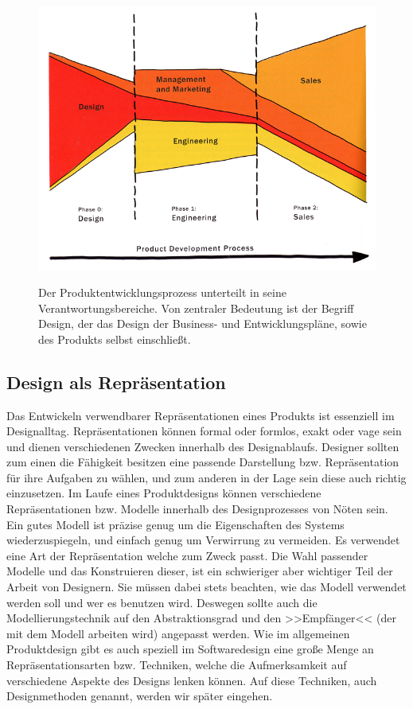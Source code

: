 \begin{figure}
        {\includegraphics[width=\linewidth]{gfx/buxtonProductDevProcess}}
		\caption[Der Produktentwicklungsprozess \newline \citep{Buxton:2007}]{Der Produktentwicklungsprozess unterteilt in seine Verantwortungsbereiche. Von zentraler Bedeutung ist der Begriff Design, der das Design der Business- und Entwicklungspläne, sowie des Produkts selbst einschließt.}\label{fig:buxtonProductDevProcess}
\end{figure}

\subsection{Design als Repräsentation}
Das Entwickeln verwendbarer Repräsentationen eines Produkts ist essenziell im Designalltag. Repräsentationen können formal oder formlos, exakt oder vage sein und dienen verschiedenen Zwecken innerhalb des Designablaufs. Designer sollten zum einen die Fähigkeit besitzen eine passende Darstellung bzw. Repräsentation für ihre Aufgaben zu wählen, und zum anderen in der Lage sein diese auch richtig einzusetzen.
Im Laufe eines Produktdesigns können verschiedene Repräsentationen bzw. Modelle innerhalb des Designprozesses von Nöten sein. Ein gutes Modell ist präzise genug um die Eigenschaften des Systems wiederzuspiegeln, und einfach genug um Verwirrung zu vermeiden. Es verwendet eine Art der Repräsentation welche zum Zweck passt.
Die Wahl passender Modelle und das Konstruieren dieser, ist ein schwieriger aber wichtiger Teil der Arbeit von Designern. Sie müssen dabei stets beachten, wie das Modell verwendet werden soll und wer es benutzen wird. Deswegen sollte auch die Modellierungstechnik auf den Abstraktionsgrad und den >>Empfänger<< (der mit dem Modell arbeiten wird) angepasst werden. \citep{Preece:1994}
Wie im allgemeinen Produktdesign gibt es auch speziell im Softwaredesign eine große Menge an Repräsentationsarten bzw. Techniken, welche die Aufmerksamkeit auf verschiedene Aspekte des Designs lenken können. Auf diese Techniken, auch Designmethoden genannt, werden wir später eingehen.

